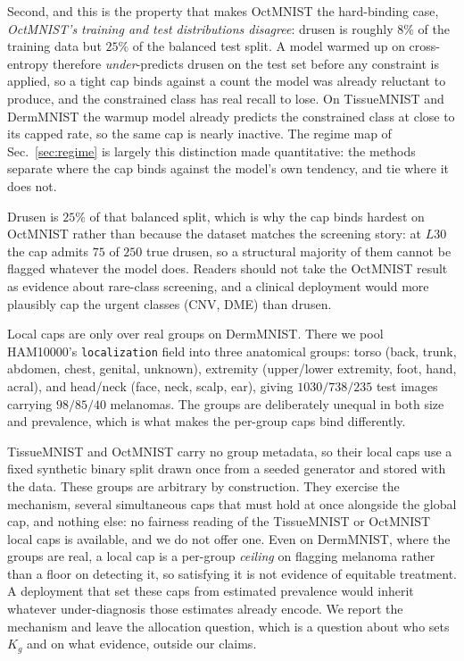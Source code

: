 \documentclass[10pt]{article}
\begin{document}
{Second, and this is the property that makes OctMNIST the hard-binding case,
\emph{OctMNIST's training and test distributions disagree}: drusen is roughly
$8\%$ of the training data but $25\%$ of the balanced test split. A model warmed
up on cross-entropy therefore \emph{under}-predicts drusen on the test set
before any constraint is applied, so a tight cap binds against a count the model
was already reluctant to produce, and the constrained class has real recall to
lose. On TissueMNIST and DermMNIST the warmup model already predicts the
constrained class at close to its capped rate, so the same cap is nearly
inactive. The regime map of Sec.~\ref{sec:regime} is largely this distinction
made quantitative: the methods separate where the cap binds against the model's
own tendency, and tie where it does not.

}

%
{Drusen is $25\%$ of that balanced split, which is why the cap
binds hardest on OctMNIST rather than because the dataset matches the
screening story: at} $L30$ the cap admits $75$ of $250$ true drusen, so a structural
majority of them cannot be flagged whatever the model does. Readers
should not take the OctMNIST result as evidence about rare-class
screening, and a clinical deployment would more plausibly cap the
urgent classes (CNV, DME) than drusen.

Local caps are only over real groups on DermMNIST. There we pool
HAM10000's \texttt{localization} field into three anatomical groups:
torso (back, trunk, abdomen, chest, genital, unknown), extremity
(upper/lower extremity, foot, hand, acral), and head/neck (face, neck,
scalp, ear), giving $1030/738/235$ test images carrying $98/85/40$
melanomas. The groups are deliberately unequal in both size and
prevalence, which is what makes the per-group caps bind differently.

TissueMNIST and OctMNIST carry no group metadata, so their local caps
use a fixed synthetic binary split drawn once from a seeded generator
and stored with the data. These groups are arbitrary by construction.
They exercise the mechanism, several simultaneous caps that must hold
at once alongside the global cap, and nothing else: no fairness
reading of the TissueMNIST or OctMNIST local caps is available, and we
do not offer one. Even on DermMNIST, where the groups are real, a
local cap is a per-group \emph{ceiling} on flagging melanoma rather
than a floor on detecting it, so satisfying it is not evidence of
equitable treatment. A deployment that set these caps from estimated
prevalence would inherit whatever under-diagnosis those estimates
already encode. We report the mechanism and leave the allocation
question, which is a question about who sets $K_g$ and on what
evidence, outside our claims.
\end{document}
